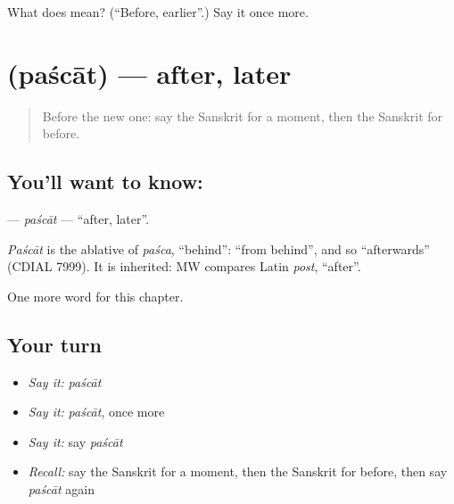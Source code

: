 \begin{tcolorbox}[breakable,colback=teal!4,colframe=teal!35!black,title={Before you move on}]
What does  mean? (\textquotedblleft{}Before, earlier\textquotedblright{}.) Say it once more.
\end{tcolorbox}
\section[\texorpdfstring{\sk{पश्चात्} (paścāt)}{पश्चात् (paścāt)}]{ (paścāt) — after, later}

\label{lesson:SA-C92-pascat}



\begin{quote}
Before the new one: say the Sanskrit for a moment, then the Sanskrit for before.
\end{quote}

\subsection*{You'll want to know: }
\textbf{} — \emph{paścāt} — \textquotedblleft{}after, later\textquotedblright{}.

\begin{cousinweb}
\emph{Paścāt} is the ablative of \emph{paśca}, \textquotedblleft{}behind\textquotedblright{}: \textquotedblleft{}from behind\textquotedblright{}, and so \textquotedblleft{}afterwards\textquotedblright{} (CDIAL 7999). It is inherited: MW compares Latin \emph{post}, \textquotedblleft{}after\textquotedblright{}.
\end{cousinweb}

\begin{grammarlens}[title={What you've built}]
One more word for this chapter.
\end{grammarlens}

\subsection*{Your turn}
\begin{itemize}
\raggedright
  \item \emph{Say it:} \emph{paścāt}
  \item \emph{Say it:} \emph{paścāt}, once more
  \item \emph{Say it:} say \emph{paścāt}
  \item \emph{Recall:} say the Sanskrit for a moment, then the Sanskrit for before, then say \emph{paścāt} again
\end{itemize}

